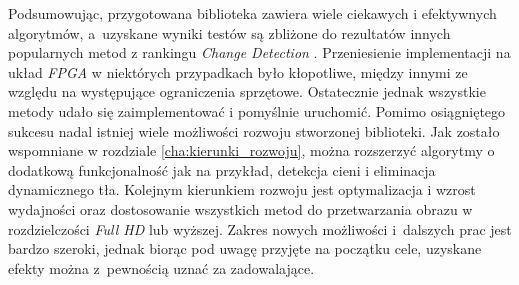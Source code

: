 Podsumowując, przygotowana biblioteka zawiera wiele ciekawych i efektywnych algorytmów, a~uzyskane wyniki testów są zbliżone do rezultatów innych popularnych metod z rankingu \textit{Change Detection} \cite{}. Przeniesienie implementacji na układ \textit{FPGA} w niektórych przypadkach było kłopotliwe, między innymi ze względu na występujące ograniczenia sprzętowe. Ostatecznie jednak wszystkie metody udało się zaimplementować i pomyślnie uruchomić. Pomimo osiągniętego sukcesu nadal istniej wiele możliwości rozwoju stworzonej biblioteki. Jak zostało wspomniane w rozdziale \ref{cha:kierunki_rozwoju}, można rozszerzyć algorytmy o dodatkową funkcjonalność jak na przykład, detekcja cieni i eliminacja dynamicznego tła. Kolejnym kierunkiem rozwoju jest optymalizacja i wzrost wydajności oraz dostosowanie wszystkich metod do przetwarzania obrazu w rozdzielczości \textit{Full HD} lub wyższej. Zakres nowych możliwości i~dalszych prac jest bardzo szeroki, jednak biorąc pod uwagę przyjęte na początku cele, uzyskane efekty można z~pewnością uznać za zadowalające. 